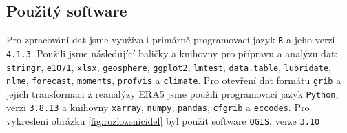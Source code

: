 \subsection{Použitý software}
Pro zpracování dat jsme využívali primárně programovací jazyk \texttt{R}\parencite{Rlanguage} a jeho verzi \texttt{4.1.3}. Použili jsme následující baličky a knihovny pro přípravu a analýzu dat: \texttt{stringr}\parencite{stringr}, \texttt{e1071}\parencite{e1071}, \texttt{xlsx}\parencite{xlsx}, \texttt{geosphere}\parencite{geosphere}, \texttt{ggplot2}\parencite{ggplot2}, \texttt{lmtest}\parencite{lmtest}, \texttt{data.table}\parencite{data.table}, \texttt{lubridate}\parencite{lubridate}, \texttt{nlme}\parencite{nlme}, \texttt{forecast}\parencite{forecast}, \texttt{moments}\parencite{moments}, \texttt{profvis}\parencite{profvis} a \texttt{climate}\parencite{climate}. Pro otevření dat formátu \texttt{grib} a jejich transformaci z reanalýzy ERA5 jsme použili programovací jazyk \texttt{Python}, verzi \texttt{3.8.13}\parencite{Python} a knihovny \texttt{xarray}\parencite{xarray}, \texttt{numpy}\parencite{numpy}, \texttt{pandas}\parencite{pandas}, \texttt{cfgrib}\parencite{cfgrib} a \texttt{eccodes}\parencite{eccodes}. Pro vykreslení obrázku \ref{fig:rozlozenicidel} byl použit software \texttt{QGIS}, verze \texttt{3.10}\parencite{qgis}
